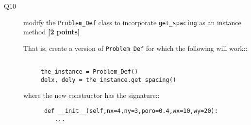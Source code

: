 \documentclass{article}
\begin{document}
\begin{description}  

  
\item[Q10] modify the \verb+Problem_Def+ class to
  incorporate \verb+get_spacing+ as an instance method \textbf{[2 points]}

  That is, create a version of \verb+Problem_Def+ for which the following will work::

\begin{verbatim}

     the_instance = Problem_Def()
     delx, dely = the_instance.get_spacing()

\end{verbatim}

where the new constructor has the signature::

\begin{verbatim}
      def __init__(self,nx=4,ny=3,poro=0.4,wx=10,wy=20):
         ...
\end{verbatim}

  
\end{description}  
\end{document}
